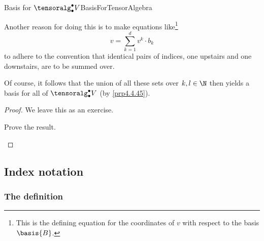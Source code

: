 \begin{prp}{Basis for $\tensoralg _{\bullet}^{\bullet}V$}{BasisForTensorAlgebra}
\begin{rmk}
		Another reason for doing this is to make equations like\footnote{This is the defining equation for the coordinates of $v$ with respect to the basis $\basis{B}$.}
		\begin{equation}
			v=\sum _{k=1}^dv^k\cdot b_k
		\end{equation}
		to adhere to the convention that identical pairs of indices, one upstairs and one downstairs, are to be summed over.
	\end{rmk}
	\begin{rmk}
		Of course, it follows that the union of all these sets over $k,l\in \N$ then yields a basis for all of $\tensoralg _{\bullet}^{\bullet}V$ (by \cref{prp4.4.45}).
	\end{rmk}
	\begin{proof}
		We leave this as an exercise.
		\begin{exr}[breakable=false]{}{}
			Prove the result.
		\end{exr}
	\end{proof}
\end{prp}

\subsection{Index notation}

\subsubsection{The definition}

